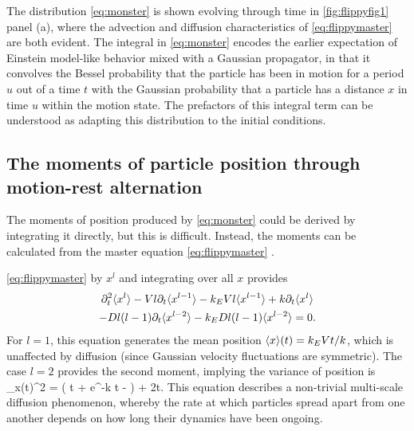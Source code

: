 The distribution \DIFaddbegin {}\DIFaddend \ref{eq:monster} is shown evolving through time in \DIFdelbegin {}\DIFdelend \DIFaddbegin {}\DIFaddend \ref{fig:flippyfig1} panel (a), where the advection and diffusion characteristics of \DIFdelbegin {}\DIFdelend \DIFaddbegin {}\DIFaddend \ref{eq:flippymaster} are both evident. The integral in \DIFdelbegin {}\DIFdelend \DIFaddbegin {}\DIFaddend \ref{eq:monster} encodes the earlier expectation of Einstein model-like behavior mixed with a Gaussian propagator, in that it convolves the Bessel \DIFaddbegin {}\DIFaddend probability that the particle has been in motion for a period $u$ out of a time $t$ with the Gaussian probability that a particle has \DIFdelbegin {}\DIFdelend \DIFaddbegin {}\DIFaddend a distance $x$ in time $u$ within the motion state. The prefactors of this integral term can be understood as adapting this distribution to the initial conditions.

\subsection{The moments of particle position through motion-rest alternation}
\DIFaddbegin 

\DIFaddend The moments of position produced by \DIFdelbegin {}\DIFdelend \DIFaddbegin {}\DIFaddend \ref{eq:monster} could be derived by integrating it directly, but this is difficult. Instead, the moments can be calculated \DIFdelbegin {}\DIFdelend from the master equation \ref{eq:flippymaster} \DIFdelbegin {}\DIFdelend \DIFaddbegin {}\DIFaddend . 

\DIFdelbegin {}\DIFdelend \DIFaddbegin {}\DIFaddend \ref{eq:flippymaster} by $x^l$ and integrating over all $x$ provides
\begin{multline} \partial_t^2 \langle x^l \rangle -V l \partial_t \langle x^{l-1} \rangle -k_E V l \langle x^{l-1} \rangle + k \partial_t \langle x^{l} \rangle\\- D l (l-1) \partial_t \langle x^{l-2} \rangle - k_E D l(l-1) \langle x^{l-2} \rangle = 0.\end{multline}
For $l = 1$, this equation generates the mean position $ \langle x \rangle(t) = k_E V t/k$, which is unaffected by diffusion (since Gaussian velocity fluctuations are symmetric).
The case $l=2$ provides the second moment, implying the variance of position is
\be \sigma_x(t)^2 = \Big( t + e^{-k t} - \Big) + 2t. \label{eq:minor} \ee
This equation describes a non-trivial multi-scale diffusion phenomenon, whereby the rate at which particles spread apart from one another depends on how long their dynamics have been ongoing.


